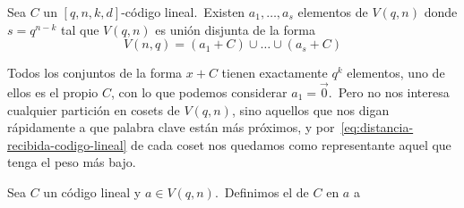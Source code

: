 \begin{lemma}
Sea $C$ un $[q, n, k, d]$-código lineal.\ Existen $a_1, \dots, a_s$ elementos de $V(q, n)$ donde $s=q^{n-k}$ tal que $V(q,n)$ es unión disjunta de la forma
	\[
		V(n, q) = (a_1+C)\cup\dots\cup (a_s+C)
	\]
\end{lemma}

Todos los conjuntos de la forma $x+C$ tienen exactamente $q^k$ elementos, uno de ellos es el propio $C$, con lo que podemos considerar $a_1=\vec{0}$.\ Pero no nos interesa cualquier partición en cosets de $V(q, n)$, sino aquellos que nos digan rápidamente a que palabra clave están más próximos, y por~\eqref{eq:distancia-recibida-codigo-lineal} de cada coset nos quedamos como representante aquel que tenga el peso más bajo.

\begin{definition}
	Sea $C$ un código lineal y $a\in V(q, n)$.\ Definimos el  de $C$ en $a$ a
\end{definition}